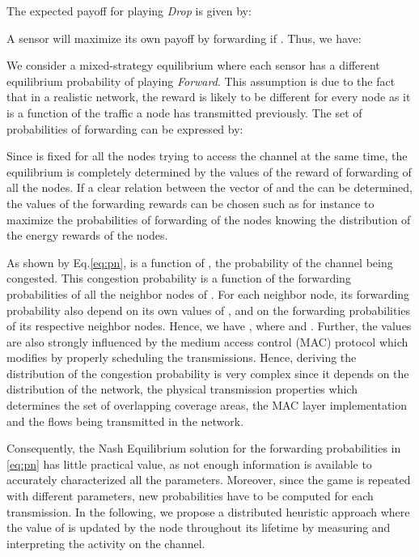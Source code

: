 \documentclass[journal, peerreview, onecolumn, draftcls]{IEEEtran}
\begin{document}
The expected payoff for playing {\it Drop} is given by:


A sensor will maximize its own payoff by forwarding if . Thus, we have:


We consider a mixed-strategy equilibrium where each sensor  has a different equilibrium probability  of playing {\it Forward}. This assumption is due to the fact that in a realistic network, the reward  is likely to be different for every node as it is a function of the traffic a node has transmitted previously. The set of probabilities of forwarding  can be expressed by:



Since  is fixed for all the nodes trying to access the channel at the same time, the equilibrium is completely determined by the values of the reward of forwarding  of all the nodes. If a clear relation between the vector of  and the  can be determined, the values of the forwarding rewards can be chosen such as for instance to maximize the probabilities of forwarding of the nodes knowing the distribution of the energy rewards of the nodes.

As shown by Eq.\eqref{eq:pn},  is a function of , the probability of the channel being congested. This congestion probability is a function of the forwarding probabilities of all the neighbor nodes  of . For each neighbor node, its forwarding probability also depend on its own values of ,  and on the forwarding probabilities of its respective neighbor nodes. Hence, we have , where  and .
Further, the  values are also strongly influenced by the medium access control (MAC) protocol which modifies  by properly scheduling the transmissions.
Hence, deriving the distribution of the congestion probability is very complex since it depends on the distribution of the network, the physical transmission properties which determines the set of overlapping coverage areas, the MAC layer implementation and the flows being transmitted in the network.

Consequently, the Nash Equilibrium solution for the forwarding probabilities in \eqref{eq:pn} has little practical value, as not enough information is available to accurately characterized all the parameters. Moreover, since the game is repeated with different  parameters, new probabilities have to be computed for each transmission. In the following, we propose a distributed heuristic approach where the value of  is updated by the node  throughout its lifetime by measuring and interpreting the activity on the channel.
\end{document}
